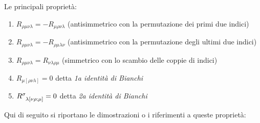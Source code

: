 Le principali proprietà:
\begin{enumerate}
    \item $R_{\rho\mu\nu\lambda} = - R_{\mu\rho\nu\lambda}$ (antisimmetrico con la permutazione dei primi due indici)
    \item $R_{\rho\mu\nu\lambda} = - R_{\rho\mu\lambda\nu}$ (antisimmetrico con la permutazione degli ultimi due indici)
    \item $R_{\rho\mu\nu\lambda} = R_{\nu\lambda\rho\mu}$ (simmetrico con lo scambio delle coppie di indici)
    \item $R_{\mu[\rho\nu\lambda]} = 0$ detta \textit{1a identità di Bianchi}
    \item $\tensor{R}{^\sigma_{\lambda[\nu\rho;\mu]}} = 0$ detta \textit{2a identità di Bianchi}
\end{enumerate}
Qui di seguito si riportano le dimostrazioni o i riferimenti a queste proprietà:
